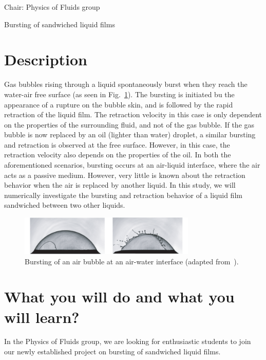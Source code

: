 \documentclass[a4paper,10pt]{article}
\begin{document}
 
\thispagestyle{empty} %

\noindent Chair: Physics of Fluids group
\begin{center}
 \begin{LARGE}
 Bursting of sandwiched liquid films
 \end{LARGE}
\end{center}

\section*{Description}
Gas bubbles rising through a liquid spontaneously burst when they reach the water-air free surface (as seen in Fig.~\ref{figure}). The bursting is initiated bu the appearance of a rupture on the bubble skin, and is followed by the rapid retraction of the liquid film. The retraction velocity in this case is only dependent on the properties of the surrounding fluid, and not of the gas bubble. If the gas bubble is now replaced by an oil (lighter than water) droplet, a similar bursting and retraction is observed at the free surface. However, in this case, the retraction velocity also depends on the properties of the oil. In both the aforementioned scenarios, bursting occurs at an air-liquid interface, where the air acts as a passive medium. However, very little is known about the retraction behavior when the air is replaced by another liquid. In this study, we will numerically investigate the bursting and retraction behavior of a liquid film sandwiched between two other liquids.

\begin{figure}[h]
\centering
\includegraphics[width=0.75\textwidth]{bubble_bursting.pdf}
\caption{Bursting of an air bubble at an air-water interface (adapted from~\cite{lhuissier2012bursting}).}
\label{figure}
\end{figure}

\section*{What you will do and what you will learn?}
In the Physics of Fluids group, we are looking for enthusiastic students to join our newly established project on bursting of sandwiched liquid films.
\end{document}
